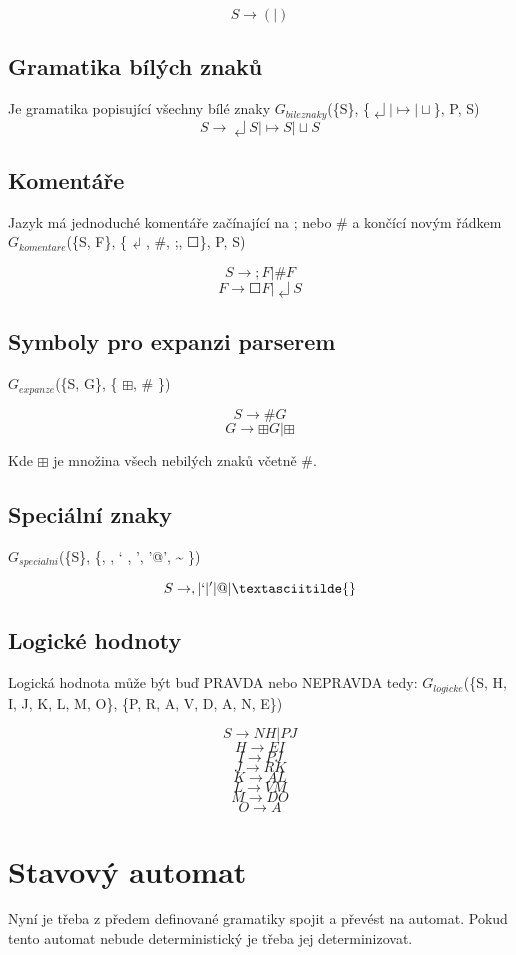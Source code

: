 \documentclass[a4paper,11pt]{article}
\begin{document}
$$S \rightarrow (|)$$

\subsection{Gramatika bílých znaků}
Je gramatika popisující všechny bílé znaky $G_{bileznaky}$(\{S\}, \{$\dlsh | \mapsto | \sqcup$\}, P, S)
$$S \rightarrow  \dlsh S | \mapsto S | \sqcup S$$

\subsection{Komentáře}
Jazyk má jednoduché komentáře začínající na ; nebo \# a končící novým řádkem $G_{komentare}$(\{S, F\}, \{$\dlsh$, \#,  ;, $\Square$\}, P, S)

$$S \rightarrow ;F | \#F$$
$$F \rightarrow \Square F | \dlsh S$$

\subsection{Symboly pro expanzi parserem}
$G_{expanze}$(\{S, G\}, \{ $\boxplus$, \# \})

$$S \rightarrow \#G$$
$$G \rightarrow \boxplus G | \boxplus$$

Kde $\boxplus$ je množina všech nebilých znaků včetně \#. 

\subsection{Speciální znaky}
$G_{specialni}$(\{S\}, \{, , ` , ', '@', \textasciitilde{} \})

$$S \rightarrow  , | ` | ' | @ | \textasciitilde{}$$

\subsection{Logické hodnoty}
Logická hodnota může být buď PRAVDA nebo NEPRAVDA tedy:
$G_{logicke}$(\{S, H, I, J, K, L, M, O\}, \{P, R, A, V, D, A, N, E\})

$$S \rightarrow N H | P J$$
$$H \rightarrow E I$$
$$I \rightarrow P J$$ 
$$J \rightarrow R K$$
$$K \rightarrow A L$$
$$L \rightarrow V M$$
$$M \rightarrow D O$$
$$O \rightarrow A$$

\section{Stavový automat}
Nyní je třeba z předem definované gramatiky spojit a převést na automat. Pokud tento automat nebude deterministický je třeba jej determinizovat.
\end{document}
